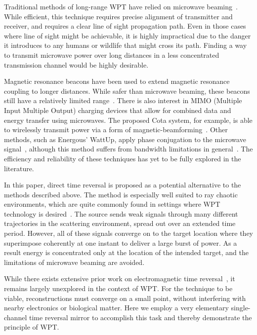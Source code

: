 \documentclass[conference]{IEEEtran}
\begin{document}
Traditional methods of long-range WPT have relied on microwave
beaming~\cite{history-wpt}.
%
While efficient, this technique requires precise alignment of transmitter and
receiver, and requires a clear line of sight propagation path.
%
Even in those cases where line of sight might be achievable, it is highly
impractical due to the danger it introduces to any humans or wildlife that might
cross its path.
%
Finding a way to transmit microwave power over long distances in a less 
concentrated transmission channel would be highly desirable.



Magnetic resonance beacons have been used to extend magnetic resonance coupling
to longer distances.
%
While safer than microwave beaming, these beacons still have a relatively
limited range~\cite{wpt-progress}.
%
There is also interest in MIMO (Multiple Input Multiple Output) charging devices
that allow for combined data and energy transfer using microwaves.
%
The proposed Cota system, for example, is able to wirelessly transmit power via
a form of magnetic-beamforming~\cite{mimo}.
%
Other methods, such as Energous' WattUp, apply phase conjugation to the
microwave signal~\cite{wattup}, although this method suffers from bandwidth
limitations in general~\cite{prada-mirror,derode-mult}.
%
The efficiency and reliability of these techniques has yet to be fully explored
in the literature.



In this paper, direct time reversal is proposed as a potential alternative to
the methods described above.
%
The method is especially well suited to ray chaotic environments, which are
quite commonly found in settings where WPT technology is desired~\cite{hemmady}.
%
The source sends weak signals through many different trajectories in the
scattering environment, spread out over an extended time period.
%
However, all of these signals converge on to the target location where they
superimpose coherently at one instant to deliver a large burst of power.
%
As a result energy is concentrated only at the location of the intended target,
and the limitations of microwave beaming are avoided.



While there exists extensive prior work on electromagnetic time
reversal~\cite{fink,nltr-wave-chaotic,nltr-classical-waves,tr-green}, it remains
largely unexplored in the context of WPT\@.
%
For the technique to be viable, reconstructions must converge on a small point,
without interfering with nearby electronics or biological matter.
%
Here we employ a very elementary single-channel time reversal mirror to
accomplish this task and thereby demonstrate the principle of WPT.
\end{document}
